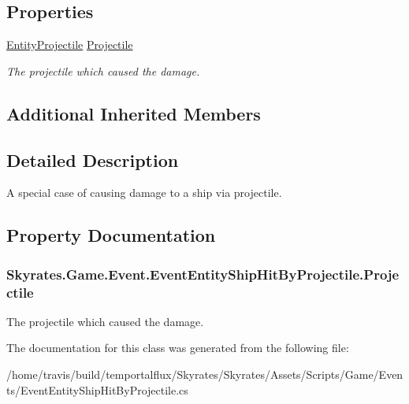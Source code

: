 \subsection*{Properties}
\begin{DoxyCompactItemize}
\item 
\hyperlink{class_skyrates_1_1_entity_1_1_entity_projectile}{Entity\-Projectile} \hyperlink{class_skyrates_1_1_game_1_1_event_1_1_event_entity_ship_hit_by_projectile_a638433c8ef56d32f5506f7d63af657ac}{Projectile}
\begin{DoxyCompactList}\small\item\em The projectile which caused the damage. \end{DoxyCompactList}\end{DoxyCompactItemize}
\subsection*{Additional Inherited Members}


\subsection{Detailed Description}
A special case of causing damage to a ship via projectile. 



\subsection{Property Documentation}
\hypertarget{class_skyrates_1_1_game_1_1_event_1_1_event_entity_ship_hit_by_projectile_a638433c8ef56d32f5506f7d63af657ac}{
\subsubsection[{Projectile}]{ Skyrates.\-Game.\-Event.\-Event\-Entity\-Ship\-Hit\-By\-Projectile.\-Projectile\hspace{0.3cm}{\ttfamily [get]}}}\label{class_skyrates_1_1_game_1_1_event_1_1_event_entity_ship_hit_by_projectile_a638433c8ef56d32f5506f7d63af657ac}


The projectile which caused the damage. 



The documentation for this class was generated from the following file\-:\begin{DoxyCompactItemize}
\item 
/home/travis/build/temportalflux/\-Skyrates/\-Skyrates/\-Assets/\-Scripts/\-Game/\-Events/Event\-Entity\-Ship\-Hit\-By\-Projectile.\-cs\end{DoxyCompactItemize}

